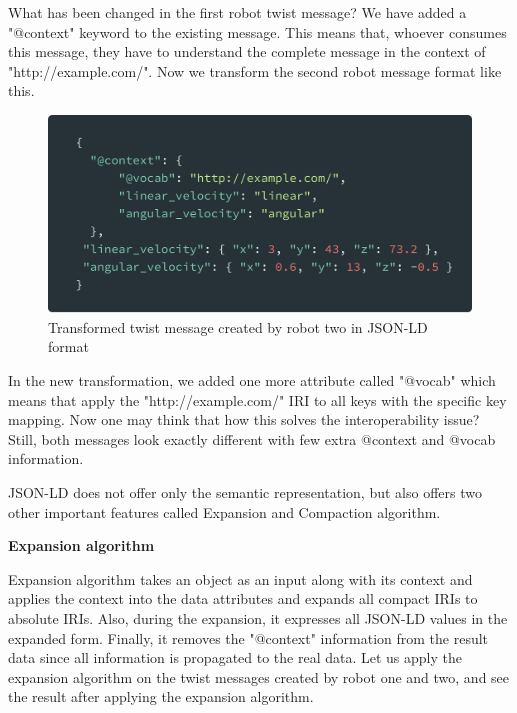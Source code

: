		What has been changed in the first robot twist message? We have added a "@context" keyword to the existing message. This means that, whoever consumes this message, they have to understand the complete message in the context of "http://example.com/". Now we transform the second robot message format like this.
		
		\begin{figure}[!htbp] 
			\begin{center}
				\includegraphics[scale=0.1]{./images/png/jsonld/4}	
				\caption{Transformed twist message created by robot two in JSON-LD format}	
				\label{fig:jsonld_4}	
			\end{center}
		\end{figure}	
	
		In the new transformation, we added one more attribute called "@vocab" which means that apply the "http://example.com/" IRI to all keys with the specific key mapping. Now one may think that how this solves the interoperability issue? Still, both messages look exactly different with few extra @context and @vocab information.
		
		JSON-LD does not offer only the semantic representation, but also offers two other important features called Expansion and Compaction algorithm.
		
		\textbf{Expansion algorithm}
		
	Expansion algorithm takes an object as an input along with its context and applies the context into the data attributes and expands all compact IRIs to absolute IRIs. Also, during the expansion, it expresses all JSON-LD values in the expanded form. Finally, it removes the "@context" information from the result data since all information is propagated to the real data. Let us apply the expansion algorithm on the twist messages created by robot one and two, and see the result after applying the expansion algorithm.
		
